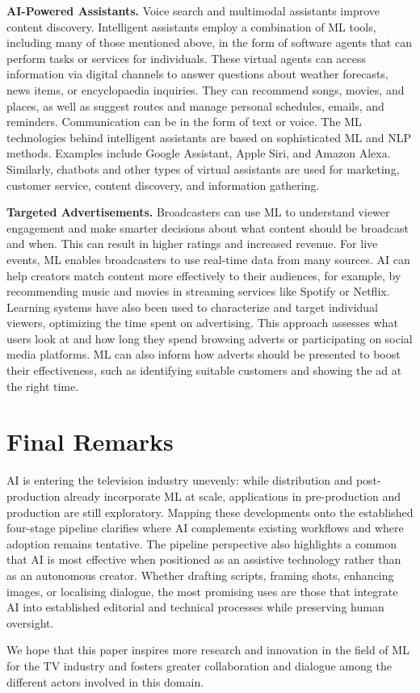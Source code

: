 \documentclass[sigconf,authorversion,review,authordraft]{webmedia}
\begin{document}
\textbf{AI-Powered Assistants.}
Voice search and multimodal assistants improve content discovery. Intelligent assistants employ a combination of ML tools, including many of those mentioned above, in the form of software agents that can perform tasks or services for individuals. These virtual agents can access information via digital channels to answer questions about weather forecasts, news items, or encyclopaedia inquiries. They can recommend songs, movies, and places, as well as suggest routes and manage personal schedules, emails, and reminders. Communication can be in the form of text or voice. The ML technologies behind intelligent assistants are based on sophisticated ML and NLP methods. Examples include Google Assistant, Apple Siri, and Amazon Alexa. Similarly, chatbots and other types of virtual assistants are used for marketing, customer service, content discovery, and information gathering\cite{xu2017new}.

\textbf{Targeted Advertisements.} Broadcasters can use ML to understand viewer engagement and make smarter decisions about what content should be broadcast and when. This can result in higher ratings and increased revenue. For live events, ML enables broadcasters to use real-time data from many sources. \ac{AI} can help creators match content more effectively to their audiences, for example, by recommending music and movies in streaming services like Spotify or Netflix. Learning systems have also been used to characterize and target individual viewers, optimizing the time spent on advertising\cite{lacerda2006learning}. This approach assesses what users look at and how long they spend browsing adverts or participating on social media platforms. ML can also inform how adverts should be presented to boost their effectiveness, such as identifying suitable customers and showing the ad at the right time.

\section{Final Remarks}
\label{sec:final-remarks}

\ac{AI} is entering the television industry unevenly: while distribution and post-production already incorporate \ac{ML} at scale, applications in pre-production and production are still exploratory. Mapping these developments onto the established four-stage pipeline clarifies where AI complements existing workflows and where adoption remains tentative. The pipeline perspective also highlights a common that \ac{AI} is most effective when positioned as an assistive technology rather than as an autonomous creator. Whether drafting scripts, framing shots, enhancing images, or localising dialogue, the most promising uses are those that integrate AI into established editorial and technical processes while preserving human oversight.

We hope that this paper inspires more research and innovation in the field of ML for the TV industry and fosters greater collaboration and dialogue among the different actors involved in this domain.



\end{document}
